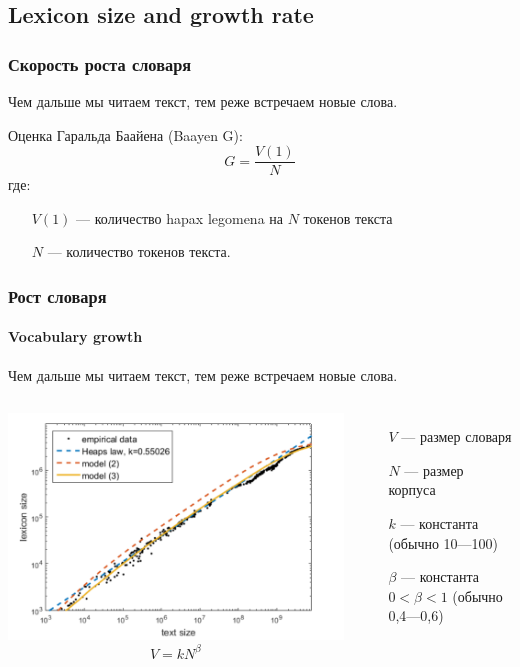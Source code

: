 \documentclass[svgnames]{beamer}
\begin{document}
\subsection{Lexicon size and growth rate}


\begin{frame}
  \frametitle{Скорость роста словаря}
  Чем дальше мы читаем текст, тем реже встречаем новые слова.

  Оценка Гаральда Баайена (Baayen G):
  \begin{equation}
    G = \frac{V(1)}{N}
  \end{equation}
где: 
\begin{itemize}
\item[$V(1)$] — количество hapax legomena на $N$ токенов текста
\item[$N$] — количество токенов текста.
\end{itemize}
\end{frame}

\begin{frame}
  \frametitle{Рост словаря}
  \framesubtitle{Vocabulary growth}
  Чем дальше мы читаем текст, тем реже встречаем новые слова.
  \begin{columns}
    \includegraphics[width=\textwidth]{heaps-law}
  \begin{equation}
    V = kN^{\beta}
  \end{equation}
  \begin{itemize}
  \item[$V$] — размер словаря
  \item[$N$] — размер корпуса
  \item[$k$] — константа (обычно 10—100)
  \item[$\beta$] — константа $0 < \beta < 1$ (обычно 0,4—0,6)
  \end{itemize}
  \end{columns}
\end{frame}
\end{document}
